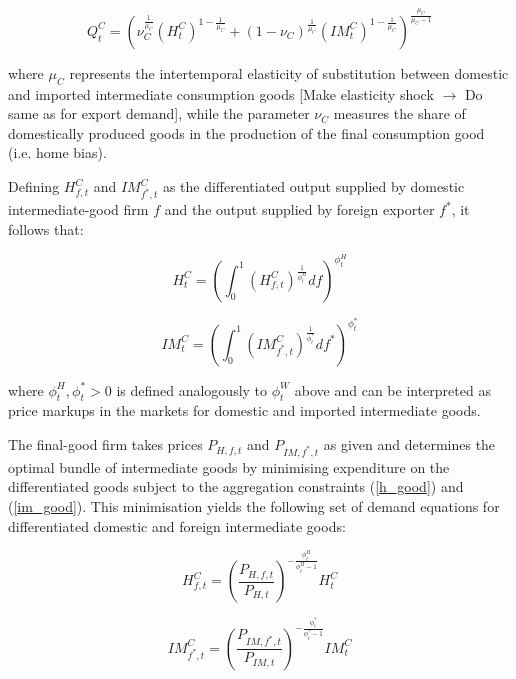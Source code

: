 \documentclass[a4paper,11pt]{article}
\numberwithin{equation}{section}
\begin{document}
	\begin{equation} \label{agg_C}
	Q_t^C=\left(\nu_{C}^{\frac{1}{\mu_C}}\left(H_t^C\right)^{1-\frac{1}{\mu_C}} +(1-\nu_{C})^{\frac{1}{\mu_C}}\left(IM_t^C\right)^{1-\frac{1}{\mu_C}}\right)^{\frac{\mu_C}{\mu_C-1}}
	\end{equation}
	
	where {\color{red} $\mu_C$ represents the intertemporal elasticity of substitution between domestic and imported intermediate consumption goods [Make elasticity shock $\to$ Do same as for export demand]}, while the parameter $\nu_{C}$ measures the share of domestically produced goods in the production of the final consumption good (i.e. home bias). 
	
	Defining $H_{f,t}^C$ and $IM_{f^*,t}^C$ as the differentiated output supplied by domestic intermediate-good firm $f$ and the output supplied by foreign exporter $f^*$, it follows that:
	
	\begin{equation} \label{h_good}
	H_t^C=\left(\int_{0}^{1}\left(H_{f,t}^C\right)^{\frac{1}{\phi_t^H}}df\right)^{\phi_t^H}
	\end{equation}
	
	\begin{equation} \label{im_good}
	IM_t^C=\left(\int_{0}^{1}\left(IM_{f^*,t}^C\right)^{\frac{1}{\phi_t^*}}df^*\right)^{\phi_t^*}
	\end{equation}
	
	where $\phi_t^H,\phi_t^*>0$ is defined analogously to $\phi_t^W$ above and can be interpreted as price markups in the markets for domestic and imported intermediate goods.
	
	The final-good firm takes prices $P_{H,f,t}$ and $P_{IM,f^*,t}$ as given and determines the optimal bundle of intermediate goods by minimising expenditure on the differentiated goods subject to the aggregation constraints (\ref{h_good}) and (\ref{im_good}). This minimisation yields the following set of demand equations for differentiated domestic and foreign intermediate goods:
	
	\begin{equation}
	H_{f,t}^C=\left(\frac{P_{H,f,t}}{P_{H,t}}\right)^{-\frac{\phi_t^H}{\phi_t^H-1}}H_t^C
	\end{equation}
	
	\begin{equation}
	IM_{f^*,t}^C=\left(\frac{P_{IM,f^*,t}}{P_{IM,t}}\right)^{-\frac{\phi_t^*}{\phi_t^*-1}}IM_t^C
	\end{equation}
	
\end{document}
